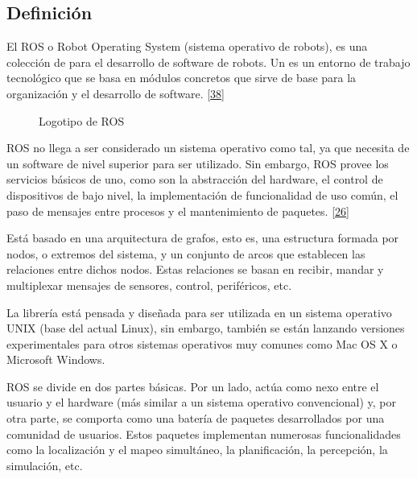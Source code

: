 \documentclass[a4paper,11pt,spanish]{sphinxmanual}
\let\sphinxpxdimen\pdfpxdimen\else\newdimen\sphinxpxdimen
\begin{document}
\subsection{Definición}
\label{\detokenize{marco_teorico_y_estado_del_arte:definicion}}
\sphinxAtStartPar
El ROS o Robot Operating System (sistema operativo de robots), es una
colección de  para el desarrollo de software de robots. Un
 es un entorno de trabajo tecnológico que se basa en módulos
concretos que sirve de base para la organización y el desarrollo de
software. {[}\hyperlink{cite.marco_teorico_y_estado_del_arte:id10}{38}{]}

\begin{figure}[htbp]
\centering
\capstart

\noindent\sphinxincludegraphics[width=300\sphinxpxdimen]{{ROS}.jpg}
\caption{Logotipo de ROS}\label{\detokenize{marco_teorico_y_estado_del_arte:id60}}\end{figure}

\sphinxAtStartPar
ROS no llega a ser considerado un sistema operativo como tal, ya que
necesita de un software de nivel superior para ser utilizado. Sin
embargo, ROS provee los servicios básicos de uno, como son la
abstracción del hardware, el control de dispositivos de bajo nivel, la
implementación de funcionalidad de uso común, el paso de mensajes entre
procesos y el mantenimiento de paquetes. {[}\hyperlink{cite.marco_teorico_y_estado_del_arte:id11}{26}{]}

\sphinxAtStartPar
Está basado en una arquitectura de grafos, esto es, una estructura
formada por nodos, o extremos del sistema, y un conjunto de arcos que
establecen las relaciones entre dichos nodos. Estas relaciones se basan
en recibir, mandar y multiplexar mensajes de sensores, control,
periféricos, etc.

\sphinxAtStartPar
La librería está pensada y diseñada para ser utilizada en un sistema
operativo UNIX (base del actual Linux), sin embargo, también se están
lanzando versiones experimentales para otros sistemas operativos muy
comunes como Mac OS X o Microsoft Windows.

\sphinxAtStartPar
ROS se divide en dos partes básicas. Por un lado, actúa como nexo entre
el usuario y el hardware (más similar a un sistema operativo
convencional) y, por otra parte, se comporta como una batería de
paquetes desarrollados por una comunidad de usuarios. Estos paquetes
implementan numerosas funcionalidades como la localización y el mapeo
simultáneo, la planificación, la percepción, la simulación, etc.
\end{document}
